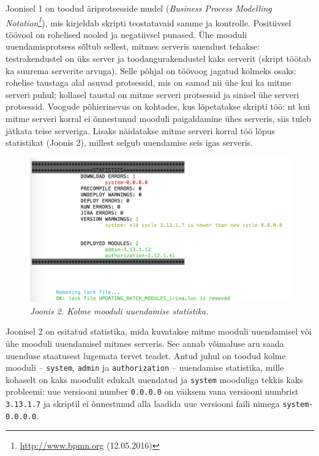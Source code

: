 \documentclass[12pt]{article}
\newcommand{\code}[1]{\texttt{#1}}
\begin{document}
   Joonisel 1 on toodud äriprotsesside mudel (\textit{Business Process Modelling Notation\footnote{\url{http://www.bpmn.org} (12.05.2016)}}), mis kirjeldab skripti teostatavaid samme ja kontrolle. Positiivsel töövool on rohelised nooled ja negatiivsel punased. Ühe mooduli uuendamisprotsess sõltub sellest, mitmes serveris uuendust tehakse: testrakendustel on üks server ja toodangurakendustel kaks serverit (skript töötab ka suurema serverite arvuga). Selle põhjal on töövoog jagatud kolmeks osaks: rohelise taustaga alal asuvad protsessid, mis on samad nii ühe kui ka mitme serveri puhul; kollasel taustal on mitme serveri protsessid ja sinisel ühe serveri protsessid. Voogude põhierinevus on kohtades, kus lõpetatakse skripti töö: nt kui mitme serveri korral ei õnnestunud mooduli paigaldamine ühes serveris, siis tuleb jätkata teise serveriga. Lisaks näidatakse mitme serveri korral töö lõpus statistikat (Joonis 2), millest selgub uuendamise seis igas serveris.
   
   \begin{figure}[H]
     \begin{center}
       \includegraphics[width=\textwidth]{screenshots/statistics.png}
       \caption*{\textit{Joonis 2. Kolme mooduli uuendamise statistika.}}
     \end{center}
   \end{figure}
   
   Joonisel 2 on esitatud statistika, mida kuvatakse mitme mooduli uuendamisel või ühe mooduli uuendamisel mitmes serveris. See annab võimaluse aru saada uuenduse staatusest lugemata tervet teadet. Antud juhul on toodud kolme mooduli \--- \code{system}, \code{admin} ja \code{authorization} \--- uuendamise statistika, mille kohaselt on  kaks moodulit edukalt uuendatud ja \code{system} mooduliga tekkis kaks probleemi: uue versiooni number \code{0.0.0.0} on väiksem vana versiooni numbrist \code{3.13.1.7} ja skriptil ei õnnestunud alla laadida uue versiooni faili nimega \code{system-0.0.0.0}. 
   
\end{document}
